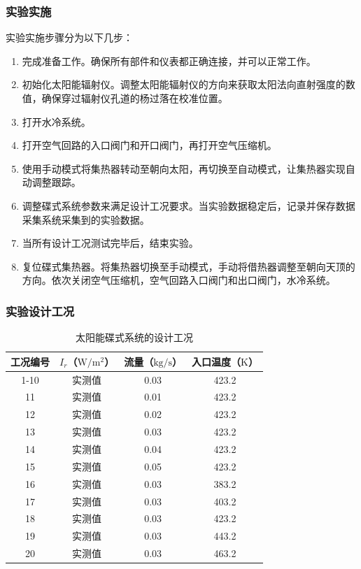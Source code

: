 \subsubsection{实验实施}
实验实施步骤分为以下几步：
\begin{enumerate}[label=(\arabic*)]
	\item 完成准备工作。确保所有部件和仪表都正确连接，并可以正常工作。
	\item 初始化太阳能辐射仪。调整太阳能辐射仪的方向来获取太阳法向直射强度的数值，确保穿过辐射仪孔道的杨过落在校准位置。
	\item 打开水冷系统。
	\item 打开空气回路的入口阀门和开口阀门，再打开空气压缩机。
	\item 使用手动模式将集热器转动至朝向太阳，再切换至自动模式，让集热器实现自动调整跟踪。
	\item 调整碟式系统参数来满足设计工况要求。当实验数据稳定后，记录并保存数据采集系统采集到的实验数据。
	\item 当所有设计工况测试完毕后，结束实验。 
	\item 复位碟式集热器。将集热器切换至手动模式，手动将借热器调整至朝向天顶的方向。依次关闭空气压缩机，空气回路入口阀门和出口阀门，水冷系统。
\end{enumerate}

\subsubsection{实验设计工况}

\begin{table}[htbp]
	\caption{太阳能碟式系统的设计工况}
	\centering
	\begin{tabular}{cccc}
		\toprule
		工况编号	& $I_r$（$\mathrm{W/m^2}$）	&	流量（$\mathrm{kg/s}$）			&	入口温度（$\mathrm{K}$）\\
		\midrule
		1-10	&	实测值	&	0.03	&	423.2\\
		11	&	实测值	&	0.01	&	423.2\\
		12	&	实测值	&	0.02	&	423.2\\
		13	&	实测值	&	0.03	&	423.2\\
		14	&	实测值	&	0.04	&	423.2\\
		15	&	实测值	&	0.05	&	423.2\\
		16	&	实测值	&	0.03	&	383.2\\
		17	&	实测值	&	0.03	&	403.2\\
		18	&	实测值	&	0.03	&	423.2\\
		19	&	实测值	&	0.03	&	443.2\\
		20	&	实测值	&	0.03	&	463.2\\
		\bottomrule
	\end{tabular}
	\label{tab:DesignedCasesForDish}
\end{table}

